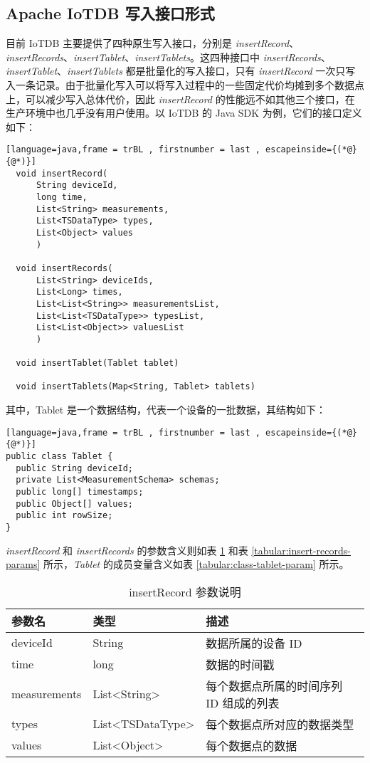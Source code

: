 \subsection{Apache IoTDB 写入接口形式}
目前 IoTDB 主要提供了四种原生写入接口，分别是 \emph{insertRecord}、\emph{insertRecords}、\emph{insertTablet}、\emph{insertTablets}。这四种接口中 \emph{insertRecords}、\emph{insertTablet}、\emph{insertTablets} 都是批量化的写入接口，只有 \emph{insertRecord} 一次只写入一条记录。由于批量化写入可以将写入过程中的一些固定代价均摊到多个数据点上，可以减少写入总体代价\cite{bercken2001evaluation}，因此 \emph{insertRecord} 的性能远不如其他三个接口，在生产环境中也几乎没有用户使用。以 IoTDB 的 Java SDK 为例，它们的接口定义如下：
\begin{lstlisting}[language=java,frame = trBL , firstnumber = last , escapeinside={(*@}{@*)}]
  void insertRecord(
      String deviceId,
      long time,
      List<String> measurements,
      List<TSDataType> types,
      List<Object> values
      )

  void insertRecords(
      List<String> deviceIds, 
      List<Long> times, 
      List<List<String>> measurementsList, 
      List<List<TSDataType>> typesList, 
      List<List<Object>> valuesList
      )

  void insertTablet(Tablet tablet)

  void insertTablets(Map<String, Tablet> tablets)
\end{lstlisting}
其中，Tablet 是一个数据结构，代表一个设备的一批数据，其结构如下：
\begin{lstlisting}[language=java,frame = trBL , firstnumber = last , escapeinside={(*@}{@*)}]
public class Tablet {
  public String deviceId;
  private List<MeasurementSchema> schemas;
  public long[] timestamps;
  public Object[] values;
  public int rowSize;
}
\end{lstlisting}
\emph{insertRecord} 和 \emph{insertRecords} 的参数含义则如表 \ref{tabular:insert-record-params} 和表 \ref{tabular:insert-records-params} 所示，\emph{Tablet} 的成员变量含义如表 \ref{tabular:class-tablet-param} 所示。
\begin{table}
  \centering
  \caption{insertRecord 参数说明}
  \begin{tabular}{lll}
    \toprule
    参数名 &  类型 & 描述 \\
    \midrule
    deviceId & String & 数据所属的设备 ID \\
    time & long & 数据的时间戳 \\
    measurements & List<String> & 每个数据点所属的时间序列 ID 组成的列表 \\
    types & List<TSDataType> & 每个数据点所对应的数据类型 \\
    values & List<Object> & 每个数据点的数据 \\
    \bottomrule
  \end{tabular}
  \label{tabular:insert-record-params}
\end{table}

